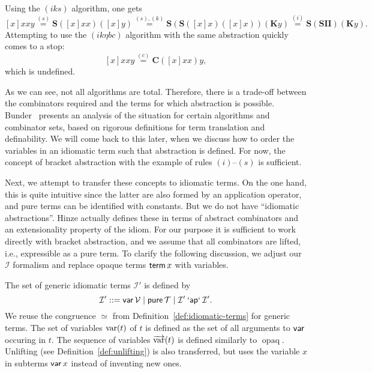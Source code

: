 \begin{example}\label{exmp:bracket-abs}
Using the $(iks)$ algorithm, one gets
\[ [x]xxy \stackrel{(s)}{=} \mathbf{S}([x]xx)([x]y)
	\stackrel{(s),(k)}{=} \mathbf{S}(\mathbf{S}([x]x)([x]x))(\mathbf{K}y)
	\stackrel{(i)}{=} \mathbf{S}(\mathbf{SII})(\mathbf{K}y). \]
Attempting to use the $(ik\eta bc)$ algorithm with the same abstraction
quickly comes to a stop:
\[ [x]xxy \stackrel{(c)}{=} \mathbf{C}([x]xx)y, \]
which is undefined.
\end{example}

As we can see, not all algorithms are total.
Therefore, there is a trade-off between the combinators required and the terms
for which abstraction is possible.
Bunder~\cite{bunder96} presents an analysis of the situation for certain
algorithms and combinator sets, based on rigorous definitions for term
translation and definability.
We will come back to this later, when we discuss how to order the variables in
an idiomatic term such that abstraction is defined.
For now, the concept of bracket abstraction with the example of rules
$(i)$--$(s)$ is sufficient.

Next, we attempt to transfer these concepts to idiomatic terms.
On the one hand, this is quite intuitive since the latter are also formed by
an application operator, and pure terms can be identified with constants.
But we do not have ``idiomatic abstractions''.
Hinze actually defines these in terms of abstract combinators and an
extensionality property of the idiom.
For our purpose it is sufficient to work directly with bracket abstraction,
and we assume that all combinators are lifted, i.e., expressible as a pure term.
To clarify the following discussion, we adjust our $\mathcal{I}$ formalism
and replace opaque terms $\operatorname{\mathsf{term}} x$ with variables.

\begin{definition}
The set of generic idiomatic terms $\mathcal{I}'$ is defined by
\begin{equation}
	\mathcal{I}' ::= \operatorname{\mathsf{var}} \mathcal{V} \mid \operatorname{\mathsf{pure}} \mathcal{T} \mid
		\mathcal{I}' \mathbin{\mathsf{`ap`}} \mathcal{I}'.
\end{equation}
We reuse the congruence $\simeq$ from Definition~\ref{def:idiomatic-terms} for
generic terms.
The set of variables $\operatorname{var}(t)$ of $t$ is defined as the set of all arguments
to $\operatorname{\mathsf{var}}$ occuring in $t$.
The sequence of variables $\overrightarrow{\operatorname{var}}(t)$ is defined similarly to $\operatorname{opaq}$.
Unlifting (see Definition~\ref{def:unlifting}) is also transferred, but uses
the variable $x$ in subterms $\operatorname{\mathsf{var}} x$ instead of inventing new ones.
\end{definition}


